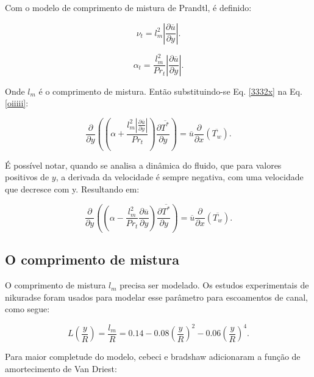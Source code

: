 Com o modelo de comprimento de mistura de Prandtl, é definido:

\begin{equation}
\nu_t = {l^2_m} \left| \frac{\partial \overline{u}}{\partial y} \right|.
\end{equation}

\begin{equation}\label{3332x}
\alpha_t = \frac{{l^2_m}}{Pr_t} \left| \frac{\partial \overline{u}}{\partial y} \right|.
\end{equation}

Onde $l_m$ é o comprimento de mistura. Então substituindo-se Eq. \ref{3332x} na Eq. \ref{oiiiii}:

\begin{equation}\label{equationquasela}
{\frac{\partial{}}{\partial{y}}} \left( \left( \alpha   
+ \frac{{l^2_m} \left| \frac{\partial \overline{u}}{\partial y} \right|}{Pr_t} \right) \frac{\partial \overline{T^\ast}}{\partial y} \right)
= 
\overline{u}\frac{\partial{}}{\partial{x}}\left(\overline{T_w}\right)  .
\end{equation}

É possível notar, quando se analisa a dinâmica do fluido, que para valores positivos de $y$, a derivada da velocidade é sempre negativa, com uma velocidade que decresce com y. Resultando em:

\begin{equation}
{\frac{\partial{}}{\partial{y}}} \left( \left( \alpha   
- \frac{{l^2_m}}{Pr_t}\frac{\partial \overline{u}}{\partial y} \right) \frac{\partial \overline{T^\ast}}{\partial y} \right)
= 
\overline{u}\frac{\partial{}}{\partial{x}}\left(\overline{T_w}\right)  .
\end{equation}

\subsection{O comprimento de mistura}

O comprimento de mistura $ l_m $ precisa ser modelado. Os estudos experimentais de nikuradse foram usados para modelar esse parâmetro para escoamentos de canal, como segue:

\begin{equation}
L\left(\frac{y}{R}\right) = \frac{l_m}{R} = 0.14 - 0.08 \left(\frac{y}{R}\right)^2 - 0.06\left(\frac{y}{R}\right)^4.
\end{equation}

Para maior completude do modelo, cebeci e bradshaw adicionaram a função de amortecimento de Van Driest:

